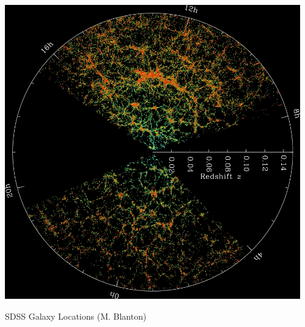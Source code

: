 \documentclass{beamer}
\begin{document}
{\begin{columns}
\begin{column}{0.5\textwidth}
        \end{column}
        \begin{column}{0.5\textwidth}
            \begin{center}
                \includegraphics[width=\textwidth]{orangepie.jpg}
            \end{center}
            {\tiny SDSS Galaxy Locations (M. Blanton)}
        \end{column}

    \end{columns}


}
\end{document}
